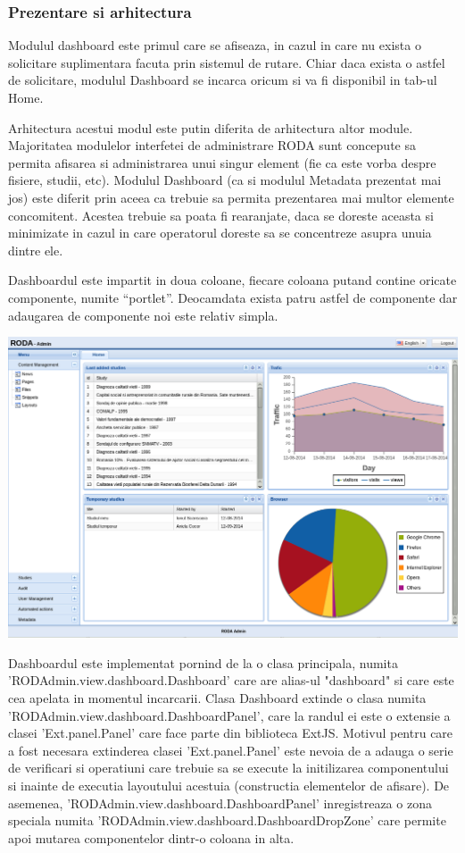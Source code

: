 \subsubsection{Prezentare si arhitectura}

Modulul dashboard este primul care se afiseaza, in cazul in care nu exista o solicitare suplimentara facuta prin sistemul de rutare. Chiar daca exista o astfel de solicitare, modulul Dashboard se incarca oricum si va fi disponibil in tab-ul Home.

Arhitectura acestui modul este putin diferita de arhitectura altor module. Majoritatea modulelor interfetei de administrare RODA sunt concepute sa permita afisarea si administrarea unui singur element (fie ca este vorba despre fisiere, studii, etc). Modulul Dashboard (ca si modulul Metadata prezentat mai jos) este diferit prin aceea ca trebuie sa permita prezentarea mai multor elemente concomitent. Acestea trebuie sa poata fi rearanjate, daca se doreste aceasta si minimizate in cazul in care operatorul doreste sa se concentreze asupra unuia dintre ele. 

Dashboardul este impartit in doua coloane, fiecare coloana putand contine oricate componente, numite “portlet”. Deocamdata exista patru astfel de componente dar adaugarea de componente noi este relativ simpla. 

\includegraphics[width=16cm]{img/dashboard}

Dashboardul este implementat pornind de la o clasa principala, numita 'RODAdmin.view.dashboard.Dashboard' care are alias-ul "dashboard" si care este cea apelata in momentul incarcarii. Clasa Dashboard extinde o clasa numita 'RODAdmin.view.dashboard.DashboardPanel', care la randul ei este o extensie a clasei 'Ext.panel.Panel' care face parte din biblioteca ExtJS. Motivul pentru care a fost necesara extinderea clasei 'Ext.panel.Panel' este nevoia de a adauga o serie de verificari si operatiuni care trebuie sa se execute la initilizarea componentului si inainte de executia layoutului acestuia (constructia elementelor de afisare). De asemenea, 'RODAdmin.view.dashboard.DashboardPanel' inregistreaza o zona speciala numita 'RODAdmin.view.dashboard.DashboardDropZone' care permite apoi mutarea componentelor dintr-o coloana in alta. 

